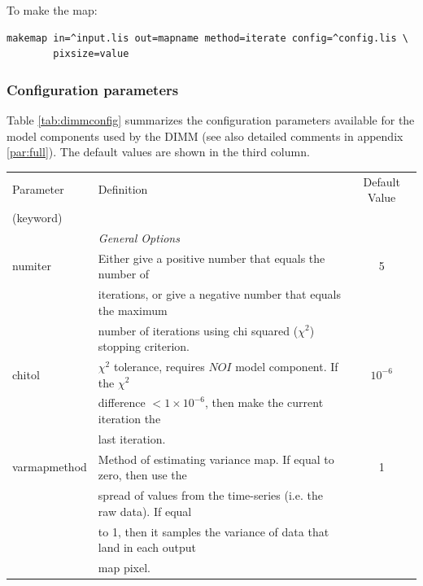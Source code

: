 \documentclass[oneside,11pt]{starlink}
\begin{document}
To make the map:
\begin{verbatim}
makemap in=^input.lis out=mapname method=iterate config=^config.lis \
        pixsize=value
\end{verbatim}


\subsubsection{Configuration parameters}

Table \ref{tab:dimmconfig} summarizes the configuration parameters
available for the model components used by the DIMM (see also detailed
comments in appendix \ref{par:full}). The default values are shown in the
third column.

\begin{table}
\footnotesize
\centering
\begin{tabular}{llc}
\hline
Parameter        & Definition                                                         &  Default Value \\
(keyword)        &                                                                    & \\
\hline
                 & \multicolumn{2}{l}{\em General Options} \\
\hline
numiter          & Either give a positive number that equals the number of             & 5\\
                 & iterations, or give a negative number that equals the maximum       & \\
                 & number of iterations using chi squared ($\chi^2$) stopping criterion.& \\
chitol           & $\chi^2$ tolerance, requires $NOI$ model component. If the $\chi^2$ & $10^{-6}$\\
                 & difference $<1\times10^{-6}$, then make the current iteration the   & \\
                 & last iteration.                                                     & \\
varmapmethod     & Method of estimating variance map. If equal to zero, then use the   & 1 \\
                 & spread of values from the time-series (i.e. the raw data). If equal & \\
                 & to 1, then it samples the variance of data that land in each output & \\
                 & map pixel.                                                          & \\

\end{tabular}
\end{table}
\end{document}
